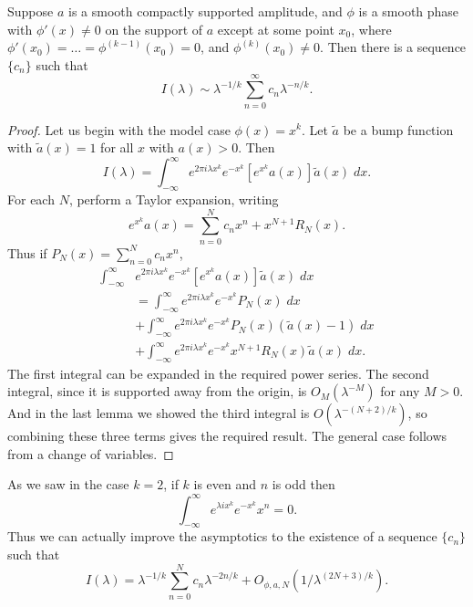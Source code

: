 \begin{theorem}
  Suppose $a$ is a smooth compactly supported amplitude, and $\phi$ is a smooth phase with $\phi'(x) \neq 0$ on the support of $a$ except at some point $x_0$, where $\phi'(x_0) = \dots = \phi^{(k-1)}(x_0) = 0$, and $\phi^{(k)}(x_0) \neq 0$. Then there is a sequence $\{ c_n \}$ such that
  \[ I(\lambda) \sim \lambda^{-1/k} \sum_{n = 0}^\infty c_n \lambda^{-n/k}. \]
\end{theorem}
\begin{proof}
  Let us begin with the model case $\phi(x) = x^k$. Let $\tilde{a}$ be a bump function with $\tilde{a}(x) = 1$ for all $x$ with $a(x) > 0$. Then
  \[ I(\lambda) = \int_{-\infty}^\infty e^{2 \pi i \lambda x^k} e^{-x^k} [e^{x^k} a(x)] \tilde{a}(x)\; dx. \]
  For each $N$, perform a Taylor expansion, writing
  \[ e^{x^k} a(x) = \sum_{n = 0}^N c_n x^n + x^{N+1} R_N(x). \]
  Thus if $P_N(x) = \sum_{n = 0}^N c_n x^n$,
  \begin{align*}
    \int_{-\infty}^\infty &e^{2 \pi i \lambda x^k} e^{-x^k} [e^{x^k} a(x)] \tilde{a}(x)\; dx\\
    & = \int_{-\infty}^\infty e^{2 \pi i \lambda x^k} e^{-x^k} P_N(x)\; dx\\
    & + \int_{-\infty}^\infty e^{2 \pi i \lambda x^k} e^{-x^k} P_N(x) (\tilde{a}(x) - 1)\; dx\\
    & + \int_{-\infty}^\infty e^{2 \pi i \lambda x^k} e^{-x^k} x^{N+1} R_N(x) \tilde{a}(x)\; dx.
  \end{align*}
  The first integral can be expanded in the required power series. The second integral, since it is supported away from the origin, is $O_M(\lambda^{-M})$ for any $M > 0$. And in the last lemma we showed the third integral is $O(\lambda^{-(N+2)/k})$, so combining these three terms gives the required result. The general case follows from a change of variables.
\end{proof}

\begin{remark}
  As we saw in the case $k = 2$, if $k$ is even and $n$ is odd then
  \[ \int_{-\infty}^\infty e^{\lambda i x^k} e^{-x^k} x^n = 0. \]
  Thus we can actually improve the asymptotics to the existence of a sequence $\{ c_n \}$ such that
  \[ I(\lambda) = \lambda^{-1/k} \sum_{n = 0}^N c_n \lambda^{-2n/k} + O_{\phi,a,N} \left( 1 / \lambda^{(2N + 3)/k} \right). \]
\end{remark}

